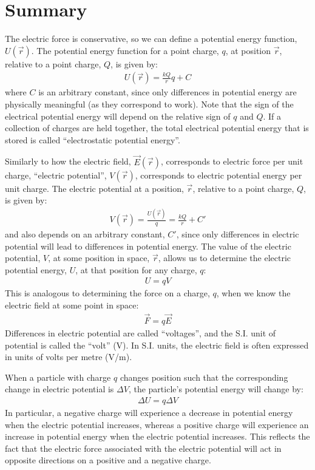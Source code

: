 \section{Summary}
\bigskip
\vspace{-1cm}
\bigskip
\begin{chapterSummary}
The electric force is conservative, so we can define a potential energy function, $U(\vec r)$. The potential energy function for a point charge, $q$, at position $\vec r$, relative to a point charge, $Q$, is given by:
\begin{align*}
U(\vec r) = \frac{kQ}{r}q + C
\end{align*}
where $C$ is an arbitrary constant, since only differences in potential energy are physically meaningful (as they correspond to work). Note that the sign of the electrical potential energy will depend on the relative sign of $q$ and $Q$. If a collection of charges are held together, the total electrical potential energy that is stored is called ``electrostatic potential energy''. 

Similarly to how the electric field, $\vec E(\vec r)$, corresponds to electric force per unit charge, ``electric potential'', $V(\vec r)$, corresponds to electric potential energy per unit charge. The electric potential at a position, $\vec r$, relative to a point charge, $Q$, is given by:
\begin{align*}
V(\vec r) =\frac{U(\vec r)}{q}= \frac{kQ}{r} + C'
\end{align*}
and also depends on an arbitrary constant, $C'$, since only differences in electric potential will lead to differences in potential energy. The value of the electric potential, $V$, at some position in space, $\vec r$, allows us to determine the electric potential energy, $U$, at that position for any charge, $q$:
\begin{align*}
U = qV
\end{align*}
This is analogous to determining the force on a charge, $q$, when we know the electric field at some point in space:
\begin{align*}
\vec F = q \vec E
\end{align*}
Differences in electric potential are called ``voltages'', and the S.I. unit of potential is called the ``volt'' (V). In S.I. units, the electric field is often expressed in units of volts per metre (V/m).

When a particle with charge $q$ changes position such that the corresponding change in electric potential is $\Delta V$, the particle's potential energy will change by:
\begin{align*}
\Delta U = q\Delta V
\end{align*}
In particular, a negative charge will experience a decrease in potential energy when the electric potential increases, whereas a positive charge will experience an increase in potential energy when the electric potential increases. This reflects the fact that the electric force associated with the electric potential will act in opposite directions on a positive and a negative charge. 


\end{chapterSummary}

